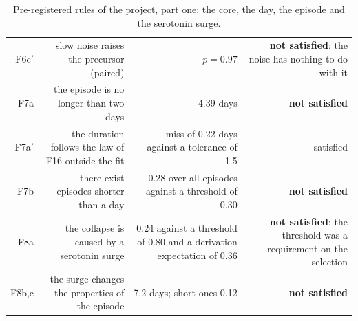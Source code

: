 \begin{table}[p]
\begin{tabular}{@{}R{0.04}R{0.30}R{0.32}R{0.27}@{}}
F6c$'$ & slow noise raises the precursor (paired) & $p=0.97$ & \textbf{not satisfied}: the noise has nothing to do with it\\
F7a & the episode is no longer than two days & 4.39 days & \textbf{not satisfied}\\
F7a$'$ & the duration follows the law of F16 outside the fit & miss of 0.22 days against a tolerance of 1.5 & satisfied\\
F7b & there exist episodes shorter than a day & 0.28 over all episodes against a threshold of 0.30 & \textbf{not satisfied}\\
F8a & the collapse is caused by a serotonin surge & 0.24 against a threshold of 0.80 and a derivation expectation of 0.36 & \textbf{not satisfied}: the threshold was a requirement on the selection\\
F8b,c & the surge changes the properties of the episode & 7.2 days; short ones 0.12 & \textbf{not satisfied}\\
\bottomrule
\end{tabular}
\caption{Pre-registered rules of the project, part one: the core, the day, the episode and the serotonin surge.}
\end{table}

